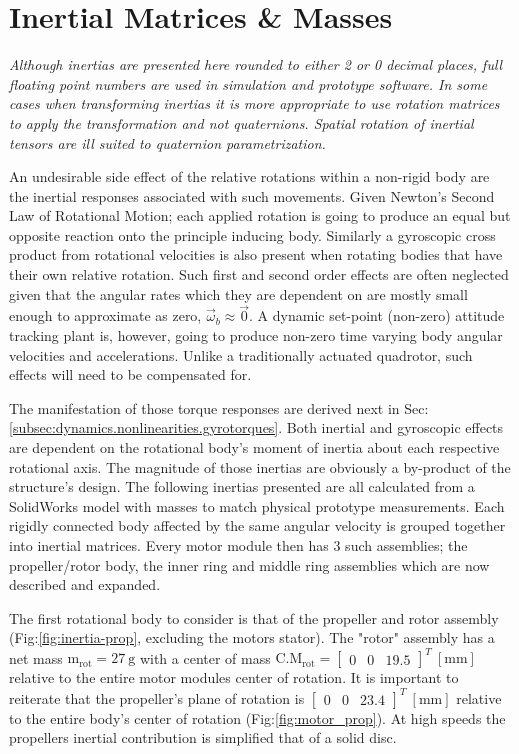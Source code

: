 \section{Inertial Matrices \& Masses}
\label{sec:proto.inertia}
\emph{\color{Gray}Although inertias are presented here rounded to either 2 or 0 decimal places, full floating point numbers are used in simulation and prototype software. In some cases when transforming inertias it is more appropriate to use rotation matrices to apply the transformation and not quaternions. Spatial rotation of inertial tensors are ill suited to quaternion parametrization.}
\par
An undesirable side effect of the relative rotations within a non-rigid body are the inertial responses associated with such movements. Given Newton's Second Law of Rotational Motion; each applied rotation is going to produce an equal but opposite reaction onto the principle inducing body. Similarly a gyroscopic cross product from rotational velocities is also present when rotating bodies that have their own relative rotation. Such first and second order effects are often neglected given that the angular rates which they are dependent on are mostly small enough to approximate as zero, $\vec{\omega}_b\approx\vec{0}$. A dynamic set-point (non-zero) attitude tracking plant is, however, going to produce non-zero time varying body angular velocities and accelerations. Unlike a traditionally actuated quadrotor, such effects will need to be compensated for.
\par
The manifestation of those torque responses are derived next in Sec:\ref{subsec:dynamics.nonlinearities.gyrotorques}. Both inertial and gyroscopic effects are dependent on the rotational body's moment of inertia about each respective rotational axis. The magnitude of those inertias are obviously a by-product of the structure's design. The following inertias presented are all calculated from a SolidWorks model with masses to match physical prototype measurements. Each rigidly connected body affected by the same angular velocity is grouped together into inertial matrices. Every motor module then has 3 such assemblies; the propeller/rotor body, the inner ring and middle ring assemblies which are now described and expanded. 
\par
The first rotational body to consider is that of the propeller and rotor assembly (Fig:\ref{fig:inertia-prop}, excluding the motors stator). The "rotor" assembly has a net mass $\text{m}_{\text{rot}}=27~\text{g}$ with a center of mass $\text{C.M}_{\text{rot}}=\begin{bmatrix}0&0&19.5\end{bmatrix}^T~[\text{mm}]$ relative to the entire motor modules center of rotation. It is important to reiterate that the propeller's plane of rotation is $\begin{bmatrix}0&0&23.4\end{bmatrix}^T~[\text{mm}]$ relative to the entire body's center of rotation (Fig:\ref{fig:motor_prop}). At high speeds the propellers inertial contribution is simplified that of a solid disc. 
